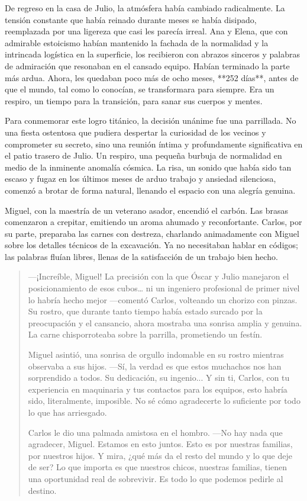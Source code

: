 \documentclass[a4paper,12pt]{book}
\begin{document}
De regreso en la casa de Julio, la atmósfera había cambiado radicalmente. La tensión constante que había reinado durante meses se había disipado, reemplazada por una ligereza que casi les parecía irreal. Ana y Elena, que con admirable estoicismo habían mantenido la fachada de la normalidad y la intrincada logística en la superficie, los recibieron con abrazos sinceros y palabras de admiración que resonaban en el cansado equipo. Habían terminado la parte más ardua. Ahora, les quedaban poco más de ocho meses, **252 días**, antes de que el mundo, tal como lo conocían, se transformara para siempre. Era un respiro, un tiempo para la transición, para sanar sus cuerpos y mentes.

Para conmemorar este logro titánico, la decisión unánime fue una parrillada. No una fiesta ostentosa que pudiera despertar la curiosidad de los vecinos y comprometer su secreto, sino una reunión íntima y profundamente significativa en el patio trasero de Julio. Un respiro, una pequeña burbuja de normalidad en medio de la inminente anomalía cósmica. La risa, un sonido que había sido tan escaso y fugaz en los últimos meses de arduo trabajo y ansiedad silenciosa, comenzó a brotar de forma natural, llenando el espacio con una alegría genuina.

Miguel, con la maestría de un veterano asador, encendió el carbón. Las brasas comenzaron a crepitar, emitiendo un aroma ahumado y reconfortante. Carlos, por su parte, preparaba las carnes con destreza, charlando animadamente con Miguel sobre los detalles técnicos de la excavación. Ya no necesitaban hablar en códigos; las palabras fluían libres, llenas de la satisfacción de un trabajo bien hecho.

\begin{quote}
    —¡Increíble, Miguel! La precisión con la que Óscar y Julio manejaron el posicionamiento de esos cubos… ni un ingeniero profesional de primer nivel lo habría hecho mejor —comentó Carlos, volteando un chorizo con pinzas. Su rostro, que durante tanto tiempo había estado surcado por la preocupación y el cansancio, ahora mostraba una sonrisa amplia y genuina. La carne chisporroteaba sobre la parrilla, prometiendo un festín.

    Miguel asintió, una sonrisa de orgullo indomable en su rostro mientras observaba a sus hijos. —Sí, la verdad es que estos muchachos nos han sorprendido a todos. Su dedicación, su ingenio... Y sin ti, Carlos, con tu experiencia en maquinaria y tus contactos para los equipos, esto habría sido, literalmente, imposible. No sé cómo agradecerte lo suficiente por todo lo que has arriesgado.

    Carlos le dio una palmada amistosa en el hombro. —No hay nada que agradecer, Miguel. Estamos en esto juntos. Esto es por nuestras familias, por nuestros hijos. Y mira, ¿qué más da el resto del mundo y lo que deje de ser? Lo que importa es que nuestros chicos, nuestras familias, tienen una oportunidad real de sobrevivir. Es todo lo que podemos pedirle al destino.
\end{quote}
\end{document}
